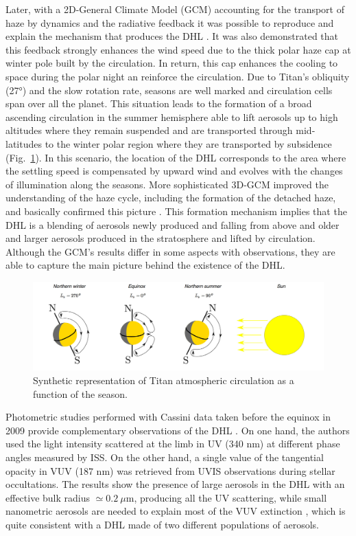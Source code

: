 Later, with a 2D-General Climate Model (GCM) accounting for the transport of haze by dynamics and the radiative
feedback it was possible to reproduce and explain the mechanism that produces the DHL \citep{Rannou2002}. It was also
demonstrated that this feedback strongly enhances the wind speed due to the thick polar haze cap at winter pole built
by the circulation. In return, this cap enhances the cooling to space during the polar night \citep{Rannou2004} an
reinforce the circulation. Due to Titan's obliquity (\ang{27}) and the slow rotation rate, seasons are well
marked and circulation cells span over all the planet. This situation leads to the formation of a
broad ascending circulation in the summer hemisphere able to lift aerosols up to high altitudes where they remain
suspended and are transported through mid-latitudes to the winter polar region where they are transported by
subsidence (Fig.~\ref{fig:titan_atm_circulation}). In this scenario, the location of the DHL corresponds to the area
where the settling speed is compensated by upward wind and evolves with the changes of illumination along the seasons.
More sophisticated 3D-GCM improved the understanding of the haze cycle, including the formation of the detached haze,
and basically confirmed this picture \citep{Lebonnois2012,Larson2015}. This formation mechanism implies that the DHL
is a blending of aerosols newly produced and falling from above and older and larger aerosols produced in the
stratosphere and lifted by circulation.
Although the GCM's results differ in some aspects with observations, they are able to capture the main picture behind
the existence of the DHL.

\begin{figure}[!ht]
    \centering
    \includegraphics[width=\textwidth]{Fig/Atmsopheric_circulation.jpg}  %
    \caption{Synthetic representation of Titan atmospheric circulation as a function of the season.}
    \label{fig:titan_atm_circulation}
\end{figure}

Photometric studies performed with Cassini data taken before the equinox in 2009 provide complementary observations
of the DHL \citep{Cours2011, Koskinen2011, Seignovert2017}.
On one hand, the authors used the light intensity scattered at the limb in UV (340 nm)
at different phase angles measured by ISS. On the other hand, a single value of the tangential opacity in VUV (187 nm)
was retrieved from UVIS observations during stellar occultations.
The results show the presence of large aerosols in the DHL with an effective bulk radius $\simeq 0.2\ \mu$m,
producing all the UV scattering, while small nanometric aerosols are needed to explain most of the VUV
extinction \citep{Cours2011}, which is quite consistent with a DHL made of two different populations of
aerosols.


